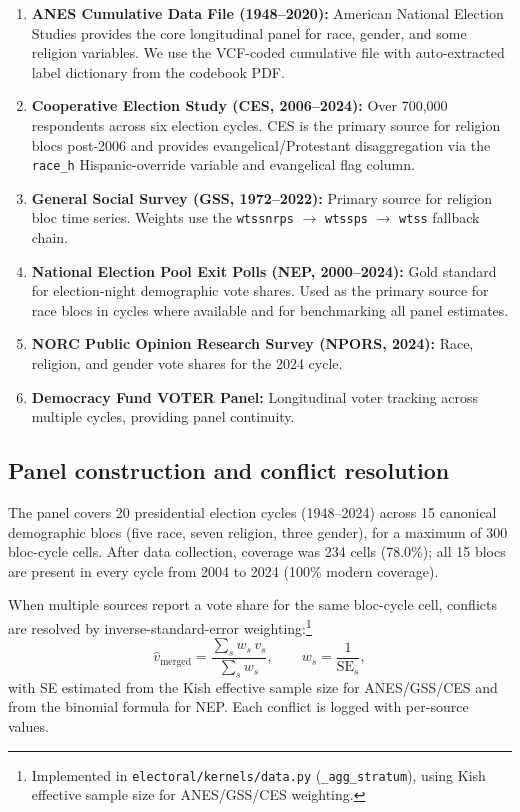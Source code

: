 \documentclass[12pt, letterpaper]{article}
\theoremstyle{definition}
\begin{document}
\begin{enumerate}
  \item \textbf{ANES Cumulative Data File (1948--2020):} American National
    Election Studies provides the core longitudinal panel for race, gender,
    and some religion variables. We use the VCF-coded cumulative file with
    auto-extracted label dictionary from the codebook PDF.

  \item \textbf{Cooperative Election Study (CES, 2006--2024):} Over 700,000
    respondents across six election cycles. CES is the primary source for
    religion blocs post-2006 and provides evangelical/Protestant
    disaggregation via the \texttt{race\_h} Hispanic-override variable and
    evangelical flag column.

  \item \textbf{General Social Survey (GSS, 1972--2022):} Primary source for
    religion bloc time series. Weights use the \texttt{wtssnrps} $\to$
    \texttt{wtssps} $\to$ \texttt{wtss} fallback chain.

  \item \textbf{National Election Pool Exit Polls (NEP, 2000--2024):} Gold
    standard for election-night demographic vote shares. Used as the primary
    source for race blocs in cycles where available and for benchmarking all
    panel estimates.

  \item \textbf{NORC Public Opinion Research Survey (NPORS, 2024):} Race,
    religion, and gender vote shares for the 2024 cycle.

  \item \textbf{Democracy Fund VOTER Panel:} Longitudinal voter tracking
    across multiple cycles, providing panel continuity.
\end{enumerate}

\subsection{Panel construction and conflict resolution}

The panel covers 20 presidential election cycles (1948--2024) across 15
canonical demographic blocs (five race, seven religion, three gender), for
a maximum of 300 bloc-cycle cells. After data collection, coverage was 234
cells (78.0\%); all 15 blocs are present in every cycle from 2004 to 2024
(100\% modern coverage).

When multiple sources report a vote share for the same bloc-cycle cell,
conflicts are resolved by inverse-standard-error weighting:\footnote{Implemented
in \texttt{electoral/kernels/data.py} (\texttt{\_agg\_stratum}), using Kish
effective sample size for ANES/GSS/CES weighting.}
\begin{equation}
  \hat{v}_{\text{merged}} = \frac{\sum_s w_s\, v_s}{\sum_s w_s},
  \qquad
  w_s = \frac{1}{\text{SE}_s},
  \label{eq:merge}
\end{equation}
with SE estimated from the Kish effective sample size for ANES/GSS/CES and
from the binomial formula for NEP. Each conflict is logged with per-source
values.
\end{document}
